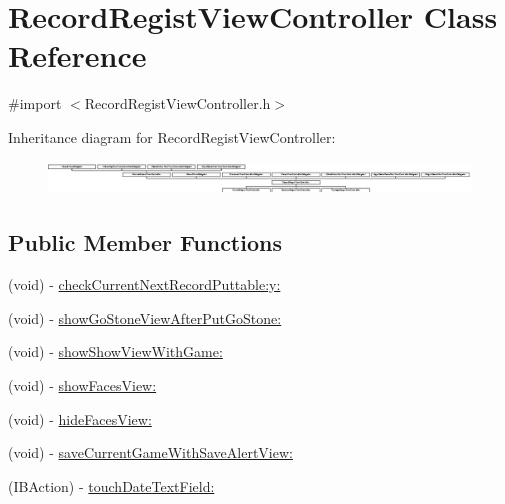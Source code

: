 \hypertarget{interface_record_regist_view_controller}{
\section{RecordRegistViewController Class Reference}
\label{interface_record_regist_view_controller}
}


{\ttfamily \#import $<$RecordRegistViewController.h$>$}

Inheritance diagram for RecordRegistViewController:\begin{figure}[H]
\begin{center}
\leavevmode
\includegraphics[height=0.870241cm]{interface_record_regist_view_controller}
\end{center}
\end{figure}
\subsection*{Public Member Functions}
\begin{DoxyCompactItemize}
\item 
(void) -\/ \hyperlink{interface_record_regist_view_controller_ab472300710aa7420fc624539419b26e2}{checkCurrentNextRecordPuttable:y:}
\item 
(void) -\/ \hyperlink{interface_record_regist_view_controller_a01283e6c99094505960ae8726f8edf3c}{showGoStoneViewAfterPutGoStone:}
\item 
(void) -\/ \hyperlink{interface_record_regist_view_controller_aebf533cc12a3238acd6f17cb7077a746}{showShowViewWithGame:}
\item 
(void) -\/ \hyperlink{interface_record_regist_view_controller_ad3da886fc450bea0353dff9e60d283a0}{showFacesView:}
\item 
(void) -\/ \hyperlink{interface_record_regist_view_controller_affdb7b97169def5c86a402e0a5095ee7}{hideFacesView:}
\item 
(void) -\/ \hyperlink{interface_record_regist_view_controller_a5ed62024840b229b56b06808ec8eb5ef}{saveCurrentGameWithSaveAlertView:}
\item 
(IBAction) -\/ \hyperlink{interface_record_regist_view_controller_ae0208bd22a30f70c0dc02a068cc8359e}{touchDateTextField:}
\end{DoxyCompactItemize}

